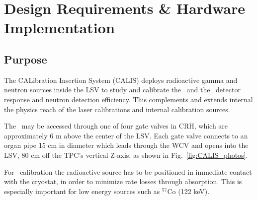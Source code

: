 \section{Design Requirements \& Hardware Implementation} \label{sec:hardware}\label{sec:design_requirements}

\subsection{Purpose}
The CALibration Insertion System (CALIS) deploys radioactive gamma and neutron sources inside the LSV to study and calibrate the \tpc\ and the \lsv\ detector response and neutron detection efficiency. This complements and extends internal the physics reach of the laser calibrations and internal calibration sources. 

The \lsv\ may be accessed through one of four gate valves in CRH, which are approximately 6 m above the center of the LSV. Each gate valve connects to an organ pipe 15 cm in diameter which leads through the WCV and opens into the LSV, 80 cm off the TPC's vertical Z-axis, as shown in Fig.~\ref{fig:CALIS_photos}.

For \tpc\ calibration the radioactive source has to be positioned in immediate contact with the cryostat, in order to minimize rate losses through absorption. This is especially important for low energy sources such as $^{57}$Co (122 keV). 

